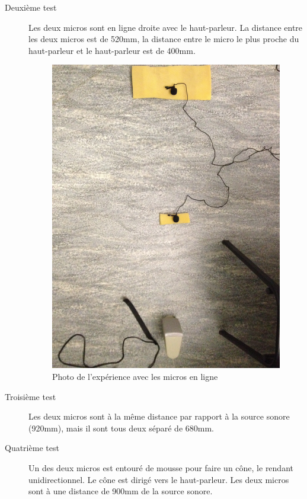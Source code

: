 \documentclass[12pt,a4paper]{article}
\begin{document}
\begin{description}
\begin{figure}[H]
	\end{figure}
\item[Deuxième test] Les deux micros sont en ligne droite avec le haut-parleur. La distance entre les deux micros est de 520mm, la distance entre le micro le plus proche du haut-parleur et le haut-parleur est de 400mm.
	\begin{figure}[H]
	\includegraphics[width=\textwidth]{../donnees11-03/test_2.jpg} 
	\caption{Photo de l'expérience avec les micros en ligne}
	\end{figure}
\item[Troisième test] Les deux micros sont à la même distance par rapport à la source sonore (920mm), mais il sont tous deux séparé de 680mm.
\item[Quatrième test] Un des deux micros est entouré de mousse pour faire un cône, le rendant unidirectionnel. Le cône est dirigé vers le haut-parleur. Les deux micros sont à une distance de 900mm de la source sonore.
	\begin{figure}[H]

\end{figure}
\end{description}
\end{document}
